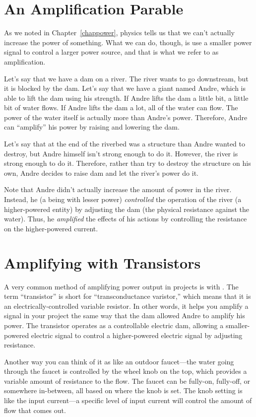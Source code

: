 \section{An Amplification Parable}

As we noted in Chapter~\ref{chappower}, physics tells us that we can't actually increase the power of something.  
What we can do, though, is use a smaller power signal to control a larger power source, and that is what we refer to as amplification.

Let's say that we have a dam on a river.
The river wants to go downstream, but it is blocked by the dam.
Let's say that we have a giant named Andre, which is able to lift the dam using his strength.
If Andre lifts the dam a little bit, a little bit of water flows.
If Andre lifts the dam a lot, all of the water can flow.
The power of the water itself is actually more than Andre's power.
Therefore, Andre can ``amplify'' his power by raising and lowering the dam.

Let's say that at the end of the riverbed was a structure than Andre wanted to destroy, but Andre himself isn't strong enough to do it.
However, the river is strong enough to do it.
Therefore, rather than try to destroy the structure on his own, Andre decides to raise dam and let the river's power do it.

Note that Andre didn't actually increase the amount of power in the river.
Instead, he (a being with lesser power) \emph{controlled} the operation of the river (a higher-powered entity) by adjusting the dam (the physical resistance against the water).
Thus, he \emph{amplified} the effects of his actions by controlling the resistance on the higher-powered current.

\section{Amplifying with Transistors}

A very common method of amplifying power output in projects is with .
The term ``transistor'' is short for ``transconductance varistor,'' which means that it is an electrically-controlled variable resistor.
In other words, it helps you amplify a signal in your project the same way that the dam allowed Andre to amplify his power.
The transistor operates as a controllable electric dam, allowing a smaller-powered electric signal to control a higher-powered electric signal by adjusting resistance.

Another way you can think of it as like an outdoor faucet---the water going through the faucet is controlled by the wheel knob on the top, which provides a variable amount of resistance to the flow.
The faucet can be fully-on, fully-off, or somewhere in-between, all based on where the knob is set.
The knob setting is like the input current---a specific level of input current will control the amount of flow that comes out.

